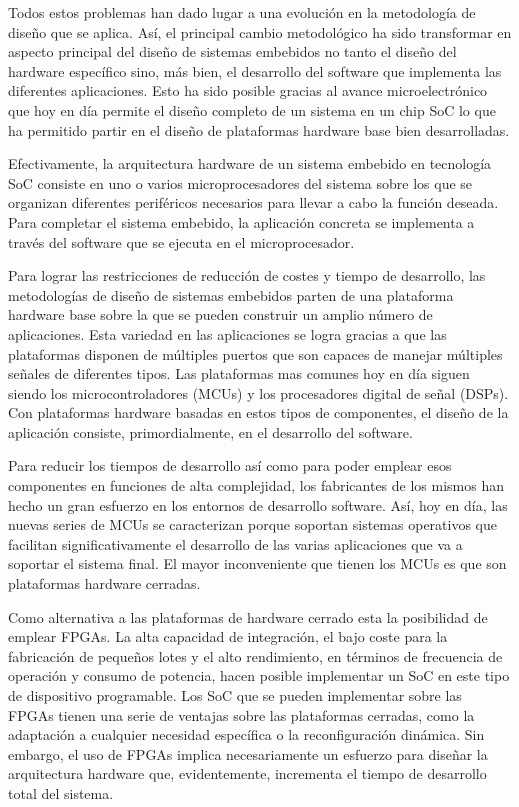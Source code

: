 Todos estos problemas han dado lugar a una evolución en la metodología de diseño que se aplica. Así, el principal cambio metodológico ha sido
transformar en aspecto principal del diseño de sistemas embebidos no tanto el diseño del hardware específico sino, más bien, el desarrollo del
software que implementa las diferentes aplicaciones. Esto ha sido posible gracias al avance microelectrónico que hoy en día permite el diseño
completo de un sistema en un chip SoC lo que ha permitido partir en el diseño de plataformas hardware base bien desarrolladas.

Efectivamente, la arquitectura hardware de un sistema embebido en tecnología SoC consiste en uno o varios microprocesadores del sistema sobre los que
se organizan diferentes periféricos necesarios para llevar a cabo la función deseada. Para completar el sistema embebido, la aplicación concreta se
implementa a través del software que se ejecuta en el microprocesador.

Para lograr las restricciones de reducción de costes y tiempo de desarrollo, las metodologías de diseño de sistemas embebidos parten de una
plataforma hardware base sobre la que se pueden construir un amplio número de aplicaciones. Esta variedad en las aplicaciones se logra gracias a que
las plataformas disponen de múltiples puertos que son capaces de manejar múltiples señales de diferentes tipos. Las plataformas mas comunes hoy en
día siguen siendo los microcontroladores (MCUs) y los procesadores digital de señal (DSPs). Con plataformas hardware basadas en  estos tipos de
componentes, el diseño de la aplicación consiste, primordialmente, en el desarrollo del software.

Para reducir los tiempos de desarrollo así como para poder emplear esos componentes en funciones de alta complejidad, los fabricantes de los mismos
han hecho un gran esfuerzo en los entornos de desarrollo software. Así, hoy en día, las nuevas series de MCUs se caracterizan porque soportan
sistemas operativos que facilitan significativamente el desarrollo de las varias aplicaciones que va a soportar el sistema final. El mayor
inconveniente que tienen los MCUs es que son plataformas hardware cerradas.

Como alternativa a las plataformas de hardware cerrado esta la posibilidad de emplear FPGAs. La alta capacidad de integración, el bajo
coste para la fabricación de pequeños lotes y el alto rendimiento, en términos de frecuencia de operación y consumo de potencia, hacen posible
implementar un SoC en este tipo de dispositivo programable. Los SoC que se pueden implementar sobre las FPGAs tienen una serie de ventajas sobre las
plataformas cerradas, como la adaptación a cualquier necesidad específica o la reconfiguración dinámica. Sin embargo, el uso de FPGAs implica
necesariamente un esfuerzo para diseñar la arquitectura hardware que, evidentemente, incrementa el tiempo de desarrollo total del sistema.

